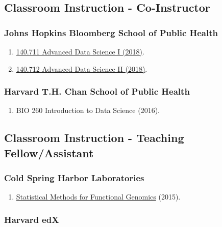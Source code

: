 \documentclass[10pt]{article}
\newcommand{\mydot}[1]{\begin{enumerate}[label=$\circ$,leftmargin=\parindent]\setlength{\itemsep}{#1}}
\newcommand{\ee}{\end{enumerate}}
\newcommand{\mylift}[1]{\vspace*{#1}}
\begin{document}

\mylift{-1.5em}
\subsection*{Classroom Instruction - Co-Instructor}

\subsubsection*{Johns Hopkins Bloomberg School of Public Health}

\mydot{-0.1em}

\item \href{https://jhu-advdatasci.github.io/2018/}{140.711 Advanced Data Science I (2018)}.
\item \href{https://jhu-advdatasci.github.io/2018/}{140.712 Advanced Data Science II (2018)}.

\ee

\subsubsection*{Harvard T.H. Chan School of Public Health}

\mydot{-0.1em}

\item BIO 260 Introduction to Data Science (2016).

\ee


\mylift{-1.5em}
\subsection*{Classroom Instruction - Teaching Fellow/Assistant}

\subsubsection*{Cold Spring Harbor Laboratories}

\mydot{-0.1em}

\item \href{http://meetings.cshl.edu/courses.aspx?course=c-data&year=15}{Statistical Methods for Functional Genomics} (2015).

\ee


\subsubsection*{Harvard edX}
\end{document}
